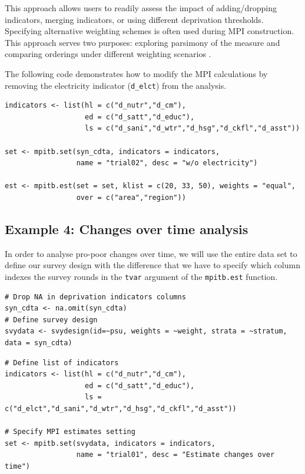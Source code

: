 This approach allows users to readily assess the impact of adding/dropping indicators, merging indicators, or using different deprivation thresholds. Specifying alternative weighting schemes is often used during MPI construction. This approach serves two purposes: exploring parsimony of the measure and comparing orderings under different weighting scenarios \citep{santos2016, alkire2022}.

The following code demonstrates how to modify the MPI calculations by removing the electricity indicator (\texttt{d\_elct}) from the analysis.

\begin{verbatim}
indicators <- list(hl = c("d_nutr","d_cm"),
                   ed = c("d_satt","d_educ"),
                   ls = c("d_sani","d_wtr","d_hsg","d_ckfl","d_asst"))

set <- mpitb.set(syn_cdta, indicators = indicators,
                 name = "trial02", desc = "w/o electricity")

est <- mpitb.est(set = set, klist = c(20, 33, 50), weights = "equal",
                 over = c("area","region"))
\end{verbatim}

\subsection{Example 4: Changes over time analysis}\label{example-4-changes-over-time-analysis}

In order to analyse pro-poor changes over time, we will use the entire data set to define our survey design with the difference that we have to specify which column indexes the survey rounds in the \texttt{tvar} argument of the \texttt{mpitb.est} function.

\begin{verbatim}
# Drop NA in deprivation indicators columns
syn_cdta <- na.omit(syn_cdta)
# Define survey design
svydata <- svydesign(id=~psu, weights = ~weight, strata = ~stratum, data = syn_cdta)
\end{verbatim}

\begin{verbatim}
# Define list of indicators
indicators <- list(hl = c("d_nutr","d_cm"),
                   ed = c("d_satt","d_educ"),
                   ls = c("d_elct","d_sani","d_wtr","d_hsg","d_ckfl","d_asst"))

# Specify MPI estimates setting
set <- mpitb.set(svydata, indicators = indicators, 
                 name = "trial01", desc = "Estimate changes over time")
\end{verbatim}


